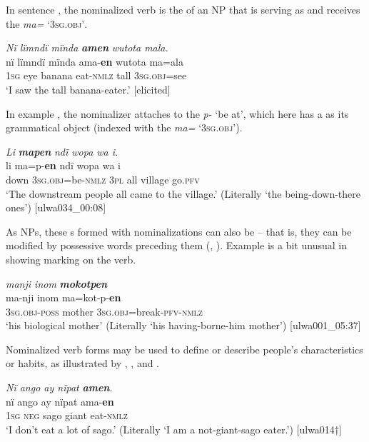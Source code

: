 In sentence , the nominalized verb is the  of an NP that is serving as  and receives the  \textit{ma=} ‘3\textsc{sg.obj’}.

\ea%
    \label{ex:nouns:26}
          \textit{Nï lïmndï mïnda} \textbf{\textit{amen}} \textit{wutota mala.}\\
\gll    nï    lïmndï  mïnda  ama-\textbf{en}  wutota  ma=ala\\
    1\textsc{sg}  eye    banana  eat-\textsc{nmlz}  tall    \textsc{3sg.obj}=see\\
\glt `I saw the tall banana-eater.’ [elicited]
\z

In example , the nominalizer  attaches to the  \textit{p-} ‘be at’, which here has a  as its grammatical object (indexed with the   \textit{ma=} ‘3\textsc{sg.obj’}).

\ea%
    \label{ex:nouns:27}
          \textit{Li} \textbf{\textit{mapen}} \textit{ndï wopa wa i.}\\
\gll li    ma=p-\textbf{en}      ndï  wopa  wa    i\\
    down  3\textsc{sg.obj}=be\textsc{{}-nmlz} 3\textsc{pl}  all    village  go.\textsc{pfv}\\
\glt `The downstream people all came to the village.’ (Literally ‘the being-down-there ones’) [ulwa034\_00:08]
\z

As NPs, these s formed with nominalizations can also be  -- that is, they can be modified by  possessive words preceding them (, ). Example  is a bit unusual in showing  marking on the verb.

\ea%
    \label{ex:nouns:28}
          \textit{manji inom} \textbf{\textit{mokotpen}}\\
\gll    ma-nji      inom  ma=kot-p-\textbf{en}\\
    3\textsc{sg.obj-poss}  mother  3\textsc{sg.obj=}break-\textsc{pfv}{}-\textsc{nmlz}\\
\glt `his biological mother’ (Literally ‘his having-borne-him mother’) [ulwa001\_05:37]
\z

Nominalized verb forms may be used to define or describe people’s characteristics or habits, as illustrated by , , and .

\ea%
    \label{ex:nouns:29}
          \textit{Nï ango ay nïpat} \textbf{\textit{amen}}.\\
\gll nï    ango  ay    nïpat  ama-\textbf{en}\\
    1\textsc{sg}  \textsc{neg}  sago  giant  eat-\textsc{nmlz}\\
\glt `I don’t eat a lot of sago.’ (Literally ‘I am a not-giant-sago eater.’) [ulwa014†]
\z

